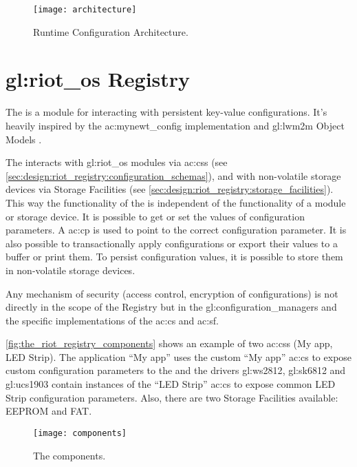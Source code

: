 \begin{figure}[H]
    \centering
    \texttt{[image: architecture]}
    \caption{Runtime Configuration Architecture.}
    \label{fig:runtime_configuration_architecture}
\end{figure}

\section{\gls*{gl:riot_os} Registry}
\label{sec:design:riot_registry}

The  is a module for interacting with persistent key-value configurations.
It's heavily inspired by the \gls{ac:mynewt_config} implementation and \gls{gl:lwm2m} Object Models \cite[p. 68]{oma-lwm2m-core-12}.

The  interacts with \gls{gl:riot_os} modules via \glspl{ac:cs} (see \autoref{sec:design:riot_registry:configuration_schemas}), and with non-volatile storage devices via Storage Facilities (see \autoref{sec:design:riot_registry:storage_facilities}).
This way the functionality of the  is independent of the functionality of a module or storage device.
It is possible to get or set the values of configuration parameters.
A \gls{ac:cp} is used to point to the correct configuration parameter.
It is also possible to transactionally apply configurations or export their values to a buffer or print them.
To persist configuration values, it is possible to store them in non-volatile storage devices.

Any mechanism of security (access control, encryption of configurations) is not directly in the scope of the Registry but in the \glspl{gl:configuration_manager} and the specific implementations of the \gls{ac:cs} and \gls{ac:sf}.

\autoref{fig:the_riot_registry_components} shows an example of two \glspl{ac:cs} (My app, LED Strip).
The application ``My app'' uses the custom ``My app'' \gls{ac:cs} to expose custom configuration parameters to the  and the drivers \gls{gl:ws2812}, \gls{gl:sk6812} and \gls{gl:ucs1903} contain instances of the ``LED Strip'' \gls{ac:cs} to expose common LED Strip configuration parameters. Also, there are two Storage Facilities available:
EEPROM and FAT.

\begin{figure}[H]
    \centering
    \texttt{[image: components]}
    \caption{The  components.}
    \label{fig:the_riot_registry_components}
\end{figure}

